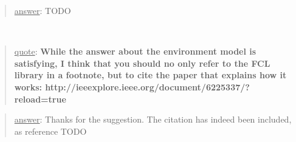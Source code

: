 \documentclass[a4paper]{article}
\newcommand\quot[1]{\begin{quote} \underline{quote}: \textbf{#1}\end{quote}}
\newcommand\as[1]{\begin{quote} \underline{answer}: {#1}\end{quote} }
\begin{document}
\as{TODO}
\leavevmode \\

\quot{
While the answer about the environment model is satisfying, I think
that you should no only refer to the FCL library in a footnote, but to
cite the paper that explains how it works:
http://ieeexplore.ieee.org/document/6225337/?reload=true
}
\as{Thanks for the suggestion. The citation has indeed been included, as reference TODO}
\leavevmode \\
\end{document}
